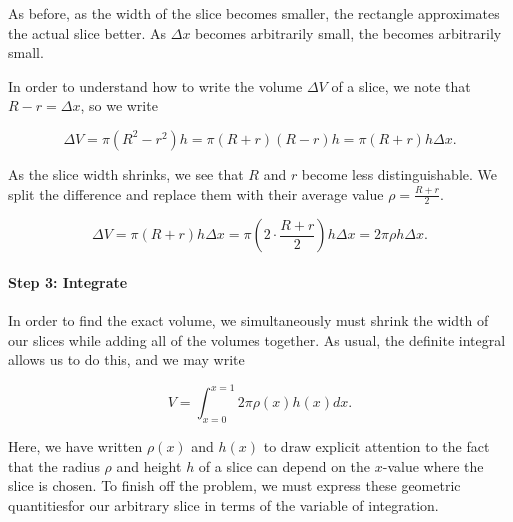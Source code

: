 \documentclass{ximera}
\begin{document}
\begin{model}
\begin{image}

            \end{image}
            
As before, as the width of the slice becomes smaller, the rectangle approximates the actual slice better.  As $\Delta x$ becomes arbitrarily small, the  becomes arbitrarily small.

In order to understand how to write the volume $\Delta V$ of a slice, we note that $R-r = \Delta x$, so we write

\[
\Delta V = \pi (R^2-r^2)h = \pi(R+r)(R-r)h = \pi(R+r)h \Delta x.
\] 

As the slice width shrinks, we see that $R$ and $r$ become less distinguishable.  We split the difference and replace them with their average value $\rho = \frac{R+r}{2}$.

\[
\Delta V = \pi (R+r)h \Delta x = \pi \left(2 \cdot \frac{R+r}{2} \right)h \Delta x  = 2\pi \rho h \Delta x.
\]        

\paragraph{Step 3: Integrate}
In order to find the exact volume, we simultaneously must shrink the width of our slices while adding all of the volumes together.  As usual, the definite integral allows us to do this, and we may write

\[
V= \int_{x=0}^{x=1} 2 \pi \rho(x) h(x) dx .
\]    

Here, we have written $\rho(x)$ and $h(x)$ to draw explicit attention to the fact that the radius $\rho$ and height $h$ of a slice can depend  on the $x$-value where the slice is chosen. To finish off the problem, we must express these geometric quantitiesfor our arbitrary slice in terms of the variable of integration.


\end{model}
\end{document}
